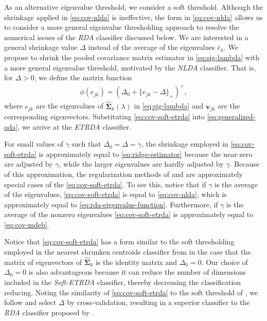 \documentclass[11pt]{article}
\begin{document}
As an alternative eigenvalue threshold, we consider a soft threshold. Although the shrinkage applied in \eqref{eq:cov-nlda} is ineffective, the form in \eqref{eq:cov-nlda} allows us to consider a more general eigenvalue thresholding approach to resolve the numerical issues of the \emph{RDA} classifier discussed below. We are interested in a general shrinkage value $\Delta$ instead of the average of the eigenvalues $\bar{e}_k$. We propose to shrink the pooled covariance matrix estimator in \eqref{eq:sig-lambda} with a more general eigenvalue threshold, motivated by the \emph{NLDA} classifier. That is, for $\Delta > 0$, we define the matrix function
\begin{align}
	\phi(e_{jk}) = (\Delta_0 + \{e_{jk} - \Delta\}_+)^{+},\label{eq:cov-soft-etrda}
\end{align}
where $e_{jk}$ are the eigenvalues of $\widehat{\bm \Sigma}_k(\lambda)$ in \eqref{eq:sig-lambda} and $\bm v_{jk}$ are the corresponding eigenvectors. Substituting \eqref{eq:cov-soft-etrda} into \eqref{eq:generalized-qda}, we arrive at the \emph{ETRDA} classifier.

For small values of $\gamma$ such that $\Delta_0 = \Delta = \gamma$, the shrinkage employed in \eqref{eq:cov-soft-etrda} is approximately equal to \eqref{eq:ridge-estimator} because the near-zero are adjusted by $\gamma$, while the larger eigenvalues are hardly adjusted by $\gamma$. Because of this approximation, the regularization methods of \cite{Friedman:1989tm} and \cite{Srivastava:2007ww} are approximately special cases of the \eqref{eq:cov-soft-etrda}. To see this, notice that if $\gamma$ is the average of the eigenvalues, \eqref{eq:cov-soft-etrda} is equal to \eqref{eq:cov-nlda}, which is approximately equal to \eqref{eq:rda-eigenvalue-function}. Furthermore, if $\gamma$ is the average of the nonzero eigenvalues \eqref{eq:cov-soft-etrda} is approximately equal to \eqref{eq:cov-mdeb}.

Notice that \eqref{eq:cov-soft-etrda} has a form similar to the soft thresholding employed in the nearest shrunken centroids classifier from \cite{Tibshirani:2002ht} in the case that the matrix of eigenvectors of $\widehat{\bm \Sigma}_k$ is the identity matrix and $\Delta_0 = 0$. Our choice of $\Delta_0 = 0$ is also advantageous because it can reduce the number of dimensions included in the \emph{Soft-ETRDA} classifier, thereby decreasing the classification reducing. Noting the similarity of \eqref{eq:cov-soft-etrda} to the soft threshold of \cite{Tibshirani:2002ht}, we follow \cite{Tibshirani:2002ht} and select $\Delta$ by cross-validation, resulting in a superior classifier to the \emph{RDA} classifier proposed by \cite{Friedman:1989tm}.
\end{document}
